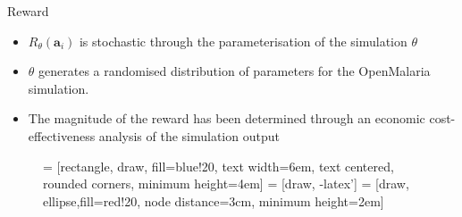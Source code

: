 \documentclass{beamer}
\begin{document}
\begin{frame}{Reward}

\begin{itemize}
\item $R_\theta(\bm{a}_i)$ is stochastic through the parameterisation of the simulation $\theta$
\item $\theta$ generates a randomised distribution of parameters for the OpenMalaria simulation. 
\item The magnitude of the reward has been determined through an economic cost-effectiveness analysis of the simulation output
\end{itemize}


\begin{figure}[!t]
\centering
{} = [rectangle, draw, fill=blue!20, 
    text width=6em, text centered, rounded corners, minimum height=4em]
 = [draw, -latex']
 = [draw, ellipse,fill=red!20, node distance=3cm,
    minimum height=2em]
    
\label{fig_flow}
\end{figure}

\end{frame}

\end{document}
